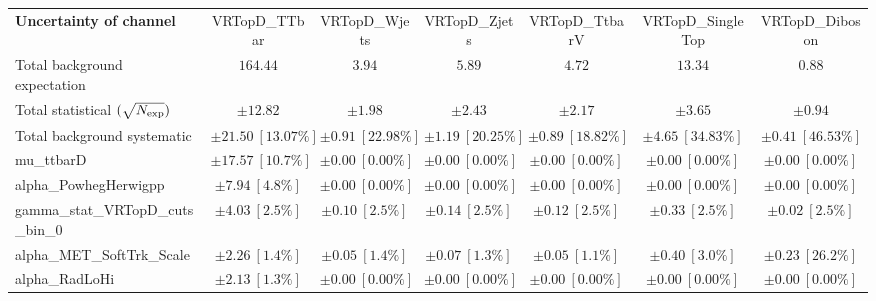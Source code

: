 
\begin{sidewaystable}
\begin{center}
\setlength{\tabcolsep}{0.0pc}
\begin{tabular*}{\textwidth}{@{\extracolsep{\fill}}lcccccc}
\noalign{\smallskip}\hline\noalign{\smallskip}
{\bf Uncertainty of channel}                                    & VRTopD\_TTbar            & VRTopD\_Wjets            & VRTopD\_Zjets            & VRTopD\_TtbarV            & VRTopD\_SingleTop            & VRTopD\_Diboson            \\
\noalign{\smallskip}\hline\noalign{\smallskip}
Total background expectation             &  $164.44$        &  $3.94$        &  $5.89$        &  $4.72$        &  $13.34$        &  $0.88$       \\
\noalign{\smallskip}\hline\noalign{\smallskip}
Total statistical $(\sqrt{N_{\rm exp}})$              & $\pm 12.82$        & $\pm 1.98$        & $\pm 2.43$        & $\pm 2.17$        & $\pm 3.65$        & $\pm 0.94$       \\
Total background systematic               & $\pm 21.50\ [13.07\%] $        & $\pm 0.91\ [22.98\%] $        & $\pm 1.19\ [20.25\%] $        & $\pm 0.89\ [18.82\%] $        & $\pm 4.65\ [34.83\%] $        & $\pm 0.41\ [46.53\%] $             \\
\noalign{\smallskip}\hline\noalign{\smallskip}
\noalign{\smallskip}\hline\noalign{\smallskip}
mu\_ttbarD         & $\pm 17.57\ [10.7\%] $          & $\pm 0.00\ [0.00\%] $          & $\pm 0.00\ [0.00\%] $          & $\pm 0.00\ [0.00\%] $          & $\pm 0.00\ [0.00\%] $          & $\pm 0.00\ [0.00\%] $       \\
alpha\_PowhegHerwigpp         & $\pm 7.94\ [4.8\%] $          & $\pm 0.00\ [0.00\%] $          & $\pm 0.00\ [0.00\%] $          & $\pm 0.00\ [0.00\%] $          & $\pm 0.00\ [0.00\%] $          & $\pm 0.00\ [0.00\%] $       \\
gamma\_stat\_VRTopD\_cuts\_bin\_0         & $\pm 4.03\ [2.5\%] $          & $\pm 0.10\ [2.5\%] $          & $\pm 0.14\ [2.5\%] $          & $\pm 0.12\ [2.5\%] $          & $\pm 0.33\ [2.5\%] $          & $\pm 0.02\ [2.5\%] $       \\
alpha\_MET\_SoftTrk\_Scale         & $\pm 2.26\ [1.4\%] $          & $\pm 0.05\ [1.4\%] $          & $\pm 0.07\ [1.3\%] $          & $\pm 0.05\ [1.1\%] $          & $\pm 0.40\ [3.0\%] $          & $\pm 0.23\ [26.2\%] $       \\
alpha\_RadLoHi         & $\pm 2.13\ [1.3\%] $          & $\pm 0.00\ [0.00\%] $          & $\pm 0.00\ [0.00\%] $          & $\pm 0.00\ [0.00\%] $          & $\pm 0.00\ [0.00\%] $          & $\pm 0.00\ [0.00\%] $       \\

\end{tabular*}
\end{center}
\end{sidewaystable}
